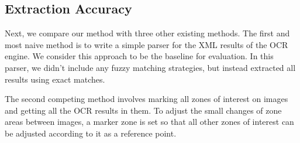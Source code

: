 
\subsection{Extraction Accuracy}
Next, we compare our method with three other existing methods.
The first and most naive method 
is to write a simple parser for the XML results of the OCR engine. 
We consider this approach to be the baseline for 
evaluation. In this parser, we didn't include any fuzzy matching 
strategies, but instead extracted all results using exact matches. 

The second competing method involves marking all zones of 
interest on images and 
getting all the OCR results in them. To adjust the small changes of 
zone areas between images, a marker zone is set so that 
all other zones of interest can be adjusted according to it as
a reference point. 



